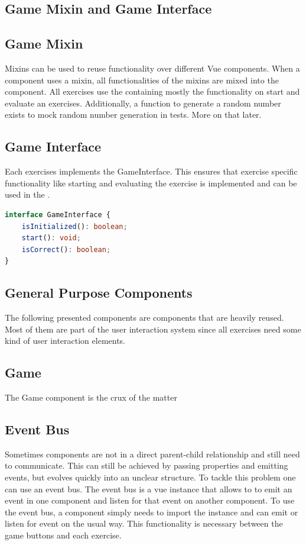 \subsection{Game Mixin and Game Interface}

\subsection*{Game Mixin}
Mixins can be used to reuse functionality over different Vue components. When a component uses a mixin, all functionalities of the mixins are mixed into the component. All exercises use the  containing mostly the functionality on start and evaluate an exercises. Additionally, a function to generate a random number exists to mock random number generation in tests. More on that later.

\subsection*{Game Interface}
Each exercises implements the GameInterface. This ensures that exercise specific functionality like starting and evaluating the exercise is implemented and can be used in the .

\begin{lstlisting}[language=TypeScript,caption={GameInterface},label={lst:gameInterface}]
interface GameInterface {
    isInitialized(): boolean;
    start(): void;
    isCorrect(): boolean;
}
\end{lstlisting}

\subsection{General Purpose Components}
\label{subsection:generalPuprposeComponents}
The following presented components are components that are heavily reused. Most of them are part of the user interaction system since all exercises need some kind of user interaction elements.

\subsection*{Game}
The Game component is the crux of the matter

\subsection{Event Bus}
Sometimes components are not in a direct parent-child relationship and still need to communicate. This can still be achieved by passing properties and emitting events, but evolves quickly into an unclear structure. To tackle this problem one can use an event bus. 
The event bus is a vue instance that allows to to emit an event in one component and listen for that event on another component. To use the event bus, a component simply needs to import the instance and can emit or listen for event on the usual way. This functionality is necessary between the game buttons and each exercise.

